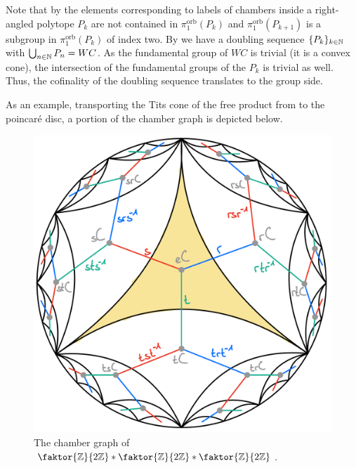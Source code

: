 
\begin{remark}\label{rmk:groupseries}
    Note that by  the elements corresponding to labels of chambers inside a right-angled polytope \(P_k\) are not contained in \(\pi_1^{\text{orb}}(P_k)\) and \(\pi_1^{\text{orb}}(P_{k+1})\) is a subgroup in \(\pi_1^{\text{orb}}(P_k)\) of index two.
    By  we have a doubling sequence \(\{P_k\}_{k \in \mathbb{N}}\) with \(\bigcup_{n \in \mathbb{N}} P_n = WC\).
    As the fundamental group of \(WC\) is trivial (it is a convex cone), the intersection of the fundamental groups of the \(P_k\) is trivial as well.
    Thus, the cofinality of the doubling sequence translates to the group side.
\end{remark}

\begin{example}
    As an example, transporting the Tits cone of the free product from  to the poincaré disc, a portion of the chamber graph is depicted below.
    \begin{figure}[h!]
        \label{fig:chambergraphex}
        \centering
        \includegraphics[width=.6\textwidth]{gfx/Chamber graph.png}
        \caption{The chamber graph of \(\faktor{\Z}{2\Z} \ast \faktor{\Z}{2\Z} \ast \faktor{\Z}{2\Z}\).}
    \end{figure}
\end{example}


